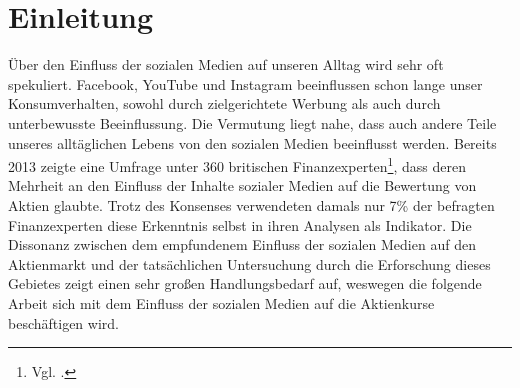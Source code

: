 \documentclass[
	a4paper,
	12pt,
	bibliography=totocnumbered,
	twoside,
]{scrreprt}
\begin{document}
\setcounter{tocdepth}{1}
\listoffigures



\listoftables




\newpage
{}
\chapter{Einleitung}
Über den Einfluss der sozialen Medien auf unseren Alltag wird sehr oft spekuliert. Facebook, YouTube und Instagram beeinflussen schon lange unser Konsumverhalten, sowohl durch zielgerichtete Werbung als auch durch unterbewusste Beeinflussung. Die Vermutung liegt nahe, dass auch andere Teile unseres alltäglichen Lebens von den sozialen Medien beeinflusst werden. Bereits 2013 zeigte eine Umfrage unter 360 britischen Finanzexperten\footnote{Vgl. \citet{colt2013}.}, dass deren Mehrheit an den Einfluss der Inhalte sozialer Medien auf die Bewertung von Aktien glaubte. Trotz des Konsenses verwendeten damals nur 7\% der befragten Finanzexperten diese Erkenntnis selbst in ihren Analysen als Indikator. Die Dissonanz zwischen dem empfundenem Einfluss der sozialen Medien auf den Aktienmarkt und der tatsächlichen Untersuchung durch die Erforschung dieses Gebietes zeigt einen sehr großen Handlungsbedarf auf, weswegen die folgende Arbeit sich mit dem Einfluss der sozialen Medien auf die Aktienkurse beschäftigen wird.\\
\end{document}
